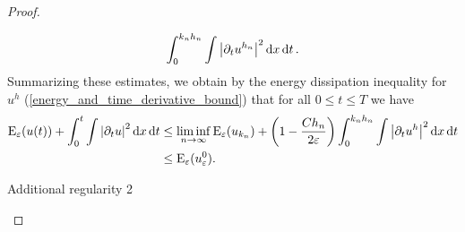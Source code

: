 \begin{proof}
\begin{description}[wide=0pt]
\begin{align*}
				\int_{ 0 }^{ k_{ n } h_{ n } }
					\int
						\abs{ \partial_{ t } u^{ h_{ n } } }^{ 2 }
					\dd{ x }
				\dd{ t }.		
	\end{align*}
	Summarizing these estimates, we obtain by the energy dissipation inequality for $ u^{ h } $ (\ref{energy_and_time_derivative_bound}) that for all $ 0 \leq t \leq T $ we have
	\begin{align*}
		\operatorname{E}_{ \varepsilon } ( u ( t ) )
		+
		\int_{ 0 }^{ t }
			\int
				\abs{ \partial_{ t } u }^{ 2 }
			\dd{ x }
		\dd{ t }
		& \leq
		\liminf_{ n \to \infty }
			\operatorname{E}_{ \varepsilon } ( u_{ k_{ n } } )
			+
			\left( 1 - \frac{ C h_{ n } }{ 2 \varepsilon } \right)
			\int_{ 0 }^{ k_{ n } h_{ n } }
				\int
					\abs{ \partial_{ t } u^{ h } }^{ 2 }
				\dd{ x }
			\dd{ t }
		\\
		& \leq
		\operatorname{E}_{ \varepsilon } ( u_{ \varepsilon }^{ 0 } ).
	\end{align*}

	\item[Step 8:] Additional regularity 2
	

\end{description}
\end{proof}
